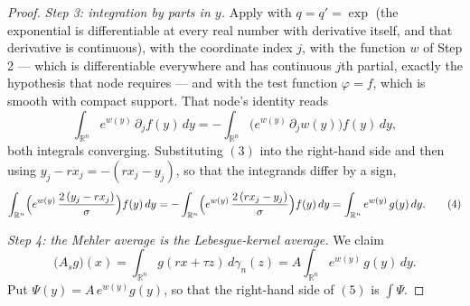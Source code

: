 \begin{proof}
\emph{Step 3: integration by parts in $y$.}
Apply  with $q = q' = \exp$ (the exponential is
differentiable at every real number with derivative itself, and that derivative is
continuous), with the coordinate index $j$, with the function $w$ of Step 2 --- which is
differentiable everywhere and has continuous $j$th partial, exactly the hypothesis that
node requires --- and with the test function $\varphi = f$, which is smooth with compact
support.  That node's identity reads
\[
  \int_{\mathbb{R}^n} e^{w(y)}\,\partial_jf(y)\,dy
    = -\int_{\mathbb{R}^n}\bigl(e^{w(y)}\,\partial_jw(y)\bigr)f(y)\,dy ,
\]
both integrals converging.  Substituting $(3)$ into the right-hand side and then using
$y_j - rx_j = -(rx_j-y_j)$, so that the integrands differ by a sign,
\begin{equation*}
  \int_{\mathbb{R}^n}
      \Bigl(e^{w(y)}\,\frac{2\,(y_j-rx_j)}{\sigma}\Bigr)f(y)\,dy
    = -\int_{\mathbb{R}^n}
        \Bigl(e^{w(y)}\,\frac{2\,(rx_j-y_j)}{\sigma}\Bigr)f(y)\,dy
    = \int_{\mathbb{R}^n} e^{w(y)}\,g(y)\,dy . \tag{4}
\end{equation*}

\emph{Step 4: the Mehler average is the Lebesgue-kernel average.}
We claim
\begin{equation*}
  \bigl(A_sg\bigr)(x) = \int_{\mathbb{R}^n} g(rx+\tau z)\,d\gamma_n(z)
    = A\int_{\mathbb{R}^n} e^{w(y)}\,g(y)\,dy . \tag{5}
\end{equation*}
Put $\Psi(y) = A\,e^{w(y)}g(y)$, so that the right-hand side of $(5)$ is $\int\Psi$.


\end{proof}
